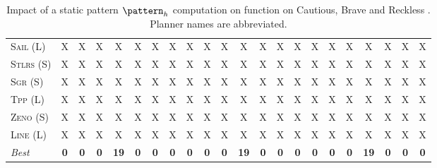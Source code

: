 \documentclass[11pt,landscape]{article}
\begin{document}
\begin{table}[tb]
{\begin{tabular}{|l||ccccccc||ccccccc||ccccccc||}
\textsc{Sail} (L)&X&X&X&X&X&X&X&X&X&X&X&X&X&X&X&X&X&X&X&X&X\\
\textsc{Stlrs} (S)&X&X&X&X&X&X&X&X&X&X&X&X&X&X&X&X&X&X&X&X&X\\
\textsc{Sgr} (S)&X&X&X&X&X&X&X&X&X&X&X&X&X&X&X&X&X&X&X&X&X\\
\textsc{Tpp} (L)&X&X&X&X&X&X&X&X&X&X&X&X&X&X&X&X&X&X&X&X&X\\
\textsc{Zeno} (S)&X&X&X&X&X&X&X&X&X&X&X&X&X&X&X&X&X&X&X&X&X\\
\textsc{Line} (L)&X&X&X&X&X&X&X&X&X&X&X&X&X&X&X&X&X&X&X&X&X
\\\hline
\textit{Best}&\textbf{0}&\textbf{0}&\textbf{0}&\textbf{19}&\textbf{0}&\textbf{0}&\textbf{0}&\textbf{0}&\textbf{0}&\textbf{0}&\textbf{19}&\textbf{0}&\textbf{0}&\textbf{0}&\textbf{0}&\textbf{0}&\textbf{0}&\textbf{19}&\textbf{0}&\textbf{0}&\textbf{0}\\\hline

        \end{tabular}}
        \caption{Impact of a static pattern $\pattern_h$ computation on function on Cautious, Brave and Reckless \pattyd. Planner names are abbreviated.}
        \label{tab:abl-patternh-static}
        \end{table}
        
\end{document}
